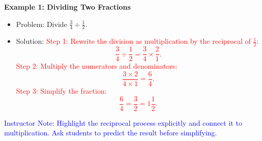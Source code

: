 \documentclass[12pt]{article}
\begin{document}
\begin{tcolorbox}[colframe=black!60, colback=white, 
coltitle=black, colbacktitle=black!15, fonttitle=\bfseries\Large, 
title=Examples, halign title=center, left=10pt, right=10pt, top=10pt, bottom=15pt]
\textbf{Example 1: Dividing Two Fractions}
\begin{itemize}
    \item Problem: Divide \( \frac{3}{4} \div \frac{1}{2} \).
    \item Solution:
    \textcolor{red}{Step 1: Rewrite the division as multiplication by the reciprocal of \( \frac{1}{2} \): 
    \[
    \frac{3}{4} \div \frac{1}{2} = \frac{3}{4} \times \frac{2}{1}.
    \]
    Step 2: Multiply the numerators and denominators:
    \[
    \frac{3 \times 2}{4 \times 1} = \frac{6}{4}.
    \]
    Step 3: Simplify the fraction:
    \[
    \frac{6}{4} = \frac{3}{2} = 1 \frac{1}{2}.
    \]}
\end{itemize}
\textcolor{blue}{Instructor Note: Highlight the reciprocal process explicitly and connect it to multiplication. Ask students to predict the result before simplifying.}
\end{tcolorbox}

\vspace{1em}
\end{document}
